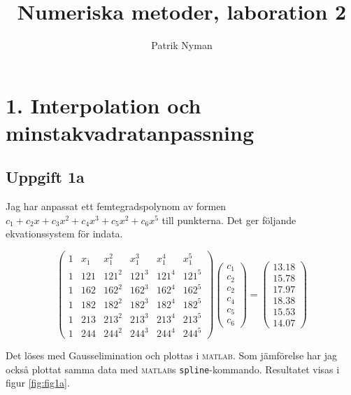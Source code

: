 \documentclass[10,]{article}
\title{Numeriska metoder, laboration 2}
\author{Patrik Nyman}
\date{}
\begin{document}
\maketitle

{
\hypersetup{linkcolor=black}
\setcounter{tocdepth}{2}
\tableofcontents
}
\section{1. Interpolation och
minstakvadratanpassning}\label{interpolation-och-minstakvadratanpassning}

\subsection{Uppgift 1a}\label{uppgift-1a}

Jag har anpassat ett femtegradspolynom av formen
\(c_1 + c_2x + c_3x^2 + c_4x^3 + c_5x^2 + c_6x^5\) till punkterna. Det
ger följande ekvationssystem för indata.

\[
\begin{pmatrix}
1 & x_1 & x_1^2 & x_1^3 & x_1^4 & x_1^5 \\
1 & 121 & 121^2 & 121^3 & 121^4 & 121^5 \\
1 & 162 & 162^2 & 162^3 & 162^4 & 162^5 \\
1 & 182 & 182^2 & 182^3 & 182^4 & 182^5 \\
1 & 213 & 213^2 & 213^3 & 213^4 & 213^5 \\
1 & 244 & 244^2 & 244^3 & 244^4 & 244^5
\end{pmatrix}
\begin{pmatrix}
c_1 \\ c_2 \\ c_2 \\ c_4 \\ c_5 \\ c_6
\end{pmatrix}
=
\begin{pmatrix}
13.18 \\ 15.78 \\ 17.97 \\ 18.38 \\ 15.53 \\ 14.07
\end{pmatrix}
\]

Det löses med Gausselimination och plottas i \textsc{matlab}. Som
jämförelse har jag också plottat samma data med \textsc{matlab}s
\texttt{spline}-kommando. Resultatet visas i figur \ref{fig:fig1a}.
\end{document}
